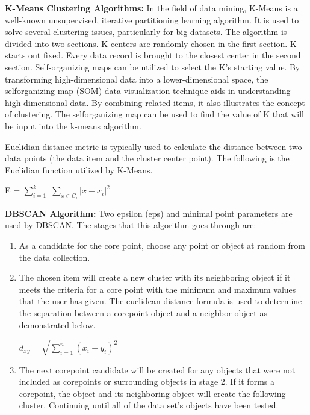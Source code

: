 \documentclass[conference]{IEEEtran}
\begin{document}
\textbf{K-Means Clustering Algorithms:} In the field of data mining, K-Means is a well-known unsupervised, iterative partitioning learning algorithm. It is used to solve several clustering issues, particularly for big datasets. The algorithm is divided into two sections. K centers are randomly chosen in the first section. K starts out fixed. Every data record is brought to the closest center in the second section. Self-organizing maps can be utilized to select the K’s starting value. By transforming high-dimensional data into a lower-dimensional space, the selforganizing map (SOM) data visualization technique aids in understanding high-dimensional data. By combining related items, it also illustrates the concept of clustering. The selforganizing map can be used to find the value of K that will be input into the k-means algorithm.

Euclidian distance metric is typically used to calculate the distance between two data points (the data item and the cluster center point). The following is the Euclidian function utilized by K-Means.

\begin{center}
E = $\sum_{i=1}^{k}$ $\sum_{x \in C_i}|x - x_i|^2$
\end{center}

\textbf{DBSCAN Algorithm: } Two epsilon (eps) and minimal point parameters are used by DBSCAN. The stages that this algorithm goes through are:

\begin{enumerate}
	\item As a candidate for the core point, choose any point or object at random from the data collection.
	\item The chosen item will create a new cluster with its neighboring object if it meets the criteria for a core point with the minimum and maximum values that the user has given. The euclidean distance formula is used to determine the separation between a corepoint object and a neighbor object as demonstrated below.
	\begin{center}
	$d_{xy} = \sqrt{ \sum_{i=1}^{n}(x_i - y_i)^2}$
	\end{center}
	
	\item The next corepoint candidate will be created for any objects that were not included as corepoints or surrounding  objects in stage 2. If it forms a corepoint, the object and its neighboring object will create the following cluster. Continuing until all of the data set’s objects have been tested.
\end{enumerate}
\end{document}
